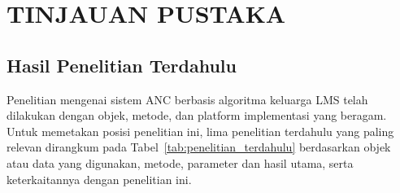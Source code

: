 \chapter{TINJAUAN PUSTAKA}
\label{chap:tinjauanpustaka}

\section{Hasil Penelitian Terdahulu}
\label{sec:hasil_terdahulu}

Penelitian mengenai sistem ANC berbasis algoritma keluarga LMS telah dilakukan dengan objek, metode, dan platform implementasi yang beragam. Untuk memetakan posisi penelitian ini, lima penelitian terdahulu yang paling relevan dirangkum pada Tabel~\ref{tab:penelitian_terdahulu} berdasarkan objek atau data yang digunakan, metode, parameter dan hasil utama, serta keterkaitannya dengan penelitian ini.

